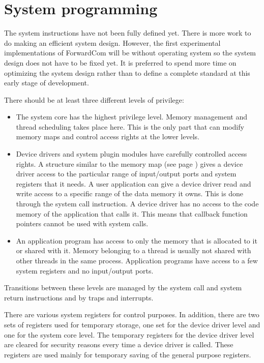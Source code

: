 \documentclass[forwardcom.tex]{subfiles}
\begin{document}
\RaggedRight

\chapter{System programming}

The system instructions have not been fully defined yet. There is more work to do making an efficient system design. However, the first experimental implementations of ForwardCom will be without operating system so the system design does not have to be fixed yet. It is preferred to spend more time on optimizing the system design rather than to define a complete standard at this early stage of development.
\vspace{2mm}

There should be at least three different levels of privilege:
\begin{itemize}
\item The system core has the highest privilege level. Memory management and thread scheduling takes place here. This is the only part that can modify memory maps and control access rights at the lower levels.

\item Device drivers and system plugin modules have carefully controlled access rights. A structure similar to the memory map (see page \pageref{memoryManagement}) gives a device driver access to the particular range of input/output ports and system registers that it needs. A user application can give a device driver read and write access to a specific range of the data memory it owns. This is done through the system call instruction. A device driver has no access to the code memory of the application that calls it. This means that callback function pointers cannot be used with system calls.

\item An application program has access to only the memory that is allocated to it or shared with it. Memory belonging to a thread is usually not shared with other threads in the same process. Application programs have access to a few system registers and no input/output ports.

\end{itemize}

Transitions between these levels are managed by the system call and system return instructions and by traps and interrupts.
\vspace{2mm}

There are various system registers for control purposes. In addition, there are two sets of registers used for temporary storage, one set for the device driver level and one for the system core level. The temporary registers for the device driver level are cleared for security reasons every time a device driver is called. These registers are used mainly for temporary saving of the general purpose registers.
\end{document}
